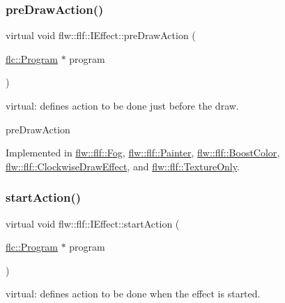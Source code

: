\subsubsection{\texorpdfstring{pre\+Draw\+Action()}{preDrawAction()}}
{\footnotesize\ttfamily virtual void flw\+::flf\+::\+I\+Effect\+::pre\+Draw\+Action (\begin{DoxyParamCaption}\item[{\hyperlink{classflw_1_1flc_1_1Program}{flc\+::\+Program} $\ast$}]{program }\end{DoxyParamCaption})\hspace{0.3cm}{\ttfamily [pure virtual]}}



virtual\+: defines action to be done just before the draw. 

pre\+Draw\+Action 

Implemented in \hyperlink{classflw_1_1flf_1_1Fog_a0d426e670e2b976601144e28c7dc5a48}{flw\+::flf\+::\+Fog}, \hyperlink{classflw_1_1flf_1_1Painter_a92e72e8875c374e4fc118cbd9e003dd5}{flw\+::flf\+::\+Painter}, \hyperlink{classflw_1_1flf_1_1BoostColor_a254c40ad807688df7bc7c8a2b8735338}{flw\+::flf\+::\+Boost\+Color}, \hyperlink{classflw_1_1flf_1_1ClockwiseDrawEffect_ab6a8333c2a80dbc56190b73f3d06264e}{flw\+::flf\+::\+Clockwise\+Draw\+Effect}, and \hyperlink{classflw_1_1flf_1_1TextureOnly_a58511d525bcd55ff7cf636a08be9afc1}{flw\+::flf\+::\+Texture\+Only}.

\mbox{\label{classflw_1_1flf_1_1IEffect_afc7cec9080d135ed264b08a90c7b94e9}} 
\subsubsection{\texorpdfstring{start\+Action()}{startAction()}}
{\footnotesize\ttfamily virtual void flw\+::flf\+::\+I\+Effect\+::start\+Action (\begin{DoxyParamCaption}\item[{\hyperlink{classflw_1_1flc_1_1Program}{flc\+::\+Program} $\ast$}]{program }\end{DoxyParamCaption})\hspace{0.3cm}{\ttfamily [pure virtual]}}



virtual\+: defines action to be done when the effect is started. 

